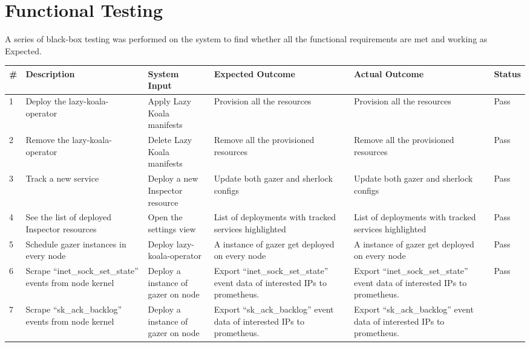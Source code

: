 \section{Functional Testing}\label{sec:functional-testing}

A series of black-box testing was performed on the system to find whether all the functional requirements are met and working as Expected.

\begin{longtable}{|p{3mm}|p{30mm}|p{27mm}|p{33mm}|p{33mm}|p{10mm}|}
    \hline
    \textbf{\#} &
      \textbf{Description} &
      \textbf{System Input} &
      \textbf{Expected Outcome} &
      \textbf{Actual Outcome} &
      \textbf{Status} \\ \hline
    1 &
      Deploy the \ac{lazy-koala-operator} &
      Apply Lazy Koala manifests &
      Provision all the resources &
      Provision all the resources &
      Pass \\ \hline
    2 &
      Remove the \ac{lazy-koala-operator} &
      Delete Lazy Koala manifests &
      Remove all the provisioned resources &
      Remove all the provisioned resources &
      Pass \\ \hline
    3 &
      Track a new service &
      Deploy a new Inspector resource &
      Update both \ac{gazer} and \ac{sherlock} configs &
      Update both \ac{gazer} and \ac{sherlock} configs &
      Pass \\ \hline
    4 &
      See the list of deployed Inspector resources &
      Open the settings view &
      List of deployments with tracked services highlighted &
      List of deployments with tracked services highlighted &
      Pass \\ \hline
    5 &
      Schedule \ac{gazer} instances in every node &
      Deploy \ac{lazy-koala-operator} &
      A instance of \ac{gazer} get deployed on every node &
      A instance of \ac{gazer} get deployed on every node &
      Pass \\ \hline
    6 &
      Scrape “inet\_sock\_set\_state” events from node kernel &
      Deploy a instance of \ac{gazer} on node &
      Export “inet\_sock\_set\_state” event data of interested IPs to prometheus. &
      Export “inet\_sock\_set\_state” event data of interested IPs to prometheus. &
      Pass \\ \hline
    7 &
      Scrape “sk\_ack\_backlog” events from node kernel &
      Deploy a instance of \ac{gazer} on node &
      Export “sk\_ack\_backlog” event data of interested IPs to prometheus. &
      Export “sk\_ack\_backlog” event data of interested IPs to prometheus. &

\end{longtable}
